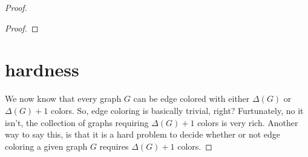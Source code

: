 \documentclass{amsbook}
\newcommand{\aaside}[2]{\marginnote{\scriptsize{#1}}[#2]}
\theoremstyle{plain}
\newtheorem{theorem}{Theorem}
\numberwithin{equation}{chapter}
\newcommand{\set}[1]{\left\{ #1 \right\}}
\newcommand{\card}[1]{\left|#1\right|}
\newcommand{\size}[1]{\left\Vert#1\right\Vert}
\begin{document}
\begin{proof}
\begin{proof}
\end{proof}




%



\section*{hardness}
We now know that every graph $G$ can be edge colored with either $\Delta(G)$ or $\Delta(G) + 1$ colors.  So, edge coloring is basically trivial, right?
Furtunately, no it isn't, the collection of graphs requiring $\Delta(G) + 1$ colors is very rich.  Another way to say this, is that it is a hard problem
to decide whether or not edge coloring a given graph $G$ requires $\Delta(G) + 1$ colors.  


\end{proof}
\end{document}

